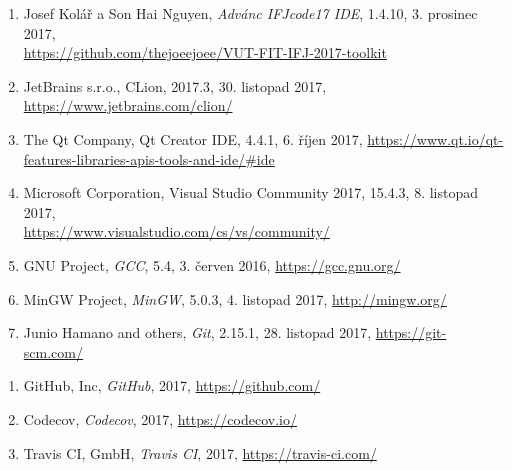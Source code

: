 \renewcommand\labelenumi{[\Alph{enumi}]}
\renewcommand\theenumi\labelenumi
\vspace{20pt}
\begin{enumerate}
	\item  Josef Kolář a Son Hai Nguyen, \emph{Advánc IFJcode17 IDE}, 1.4.10, 3. prosinec 2017,\\\href{https://github.com/thejoeejoee/VUT-FIT-IFJ-2017-toolkit}{https://github.com/thejoeejoee/VUT-FIT-IFJ-2017-toolkit}
	\item JetBrains s.r.o., CLion, 2017.3, 30. listopad 2017, \href{https://www.jetbrains.com/clion/}{https://www.jetbrains.com/clion/}
	\item The Qt Company, Qt Creator IDE, 4.4.1, 6. říjen 2017, \href{https://www.qt.io/qt-features-libraries-apis-tools-and-ide/\#ide}{https://www.qt.io/qt-features-libraries-apis-tools-and-ide/\#ide}
	\item Microsoft Corporation, Visual Studio Community 2017, 15.4.3, 8. listopad 2017,\\\href{https://www.visualstudio.com/cs/vs/community/}{https://www.visualstudio.com/cs/vs/community/}
	\item GNU Project, \emph{GCC}, 5.4, 3. červen 2016, \href{https://gcc.gnu.org/}{https://gcc.gnu.org/}
	\item MinGW Project, \emph{MinGW}, 5.0.3, 4. listopad 2017, \href{http://mingw.org/}{http://mingw.org/}
	\item Junio Hamano and others, \emph{Git}, 2.15.1, 28. listopad 2017, \href{https://git-scm.com/}{https://git-scm.com/}
\end{enumerate}

\renewcommand\labelenumi{[\Roman{enumi}]}
\renewcommand\theenumi\labelenumi
\vspace{20pt}
\begin{enumerate}
	\item GitHub, Inc, \emph{GitHub}, 2017, \href{https://github.com/}{https://github.com/}
	\item Codecov, \emph{Codecov}, 2017, \href{https://codecov.io/}{https://codecov.io/}
	\item Travis CI, GmbH, \emph{Travis CI}, 2017, \href{https://travis-ci.com/}{https://travis-ci.com/}
\end{enumerate}